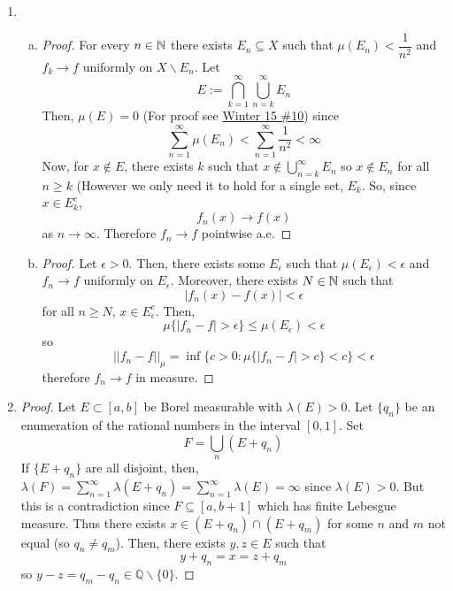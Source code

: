 \begin{enumerate}
\begin{enumerate}[(a)]
	\item \begin{proof}
		Let $f(t)=1$ for all $t \in [0,1]$. Then, $||f||_\infty=1$ and
			\[ ||Tf||_\infty = \sup_{t \in [0,1]} \left| \int_0^t s \, ds \right| = \sup_{t\in [0,1]} \dfrac{t^2}{2} = \dfrac 12 \]
		so $||T||=\dfrac 12$.
	\end{proof}
\end{enumerate}

\item \begin{enumerate}[(a)]
	\item \begin{proof}
		For every $n \in \mathbb{N}$ there exists $E_n \subseteq X$ such that $\mu(E_n) < \dfrac 1{n^2}$ and $f_k \to f$ uniformly on $X \backslash E_n$. Let 
			\[ E := \bigcap_{k=1}^\infty \bigcup_{n=k}^\infty E_n\]
		Then, $\mu(E) = 0$ (For proof see \hyperref[q:w15-10]{Winter 15 \#10}) since 
			\[ \sum_{n=1}^\infty \mu(E_n) < \sum_{n=1}^\infty \dfrac 1{n^2} < \infty \]
		Now, for $x \not\in E$, there exists $k$ such that $x \not\in \bigcup_{n=k}^\infty E_n$ so $x \not\in E_n$ for all $n \ge k$ (However we only need it to hold for a single set, $E_k$. So, since $x \in E_k^c$,
			\[ f_n(x) \to f(x) \]
		as $n \to \infty$. Therefore $f_n \to f$ pointwise a.e.
	\end{proof}
	
	\item \begin{proof}
		Let $\epsilon >0$. Then, there exists some $E_\epsilon$ such that $\mu(E_\epsilon) < \epsilon$ and $f_n \to f$ uniformly on $E_\epsilon$. Moreover, there exists $N \in \mathbb{N}$ such that
			\[ |f_n(x)-f(x)| < \epsilon \]
		for all $n \ge N$, $x \in E_\epsilon^c$. Then,
			\[ \mu\{|f_n-f| > \epsilon \} \le \mu(E_\epsilon) <\epsilon \]
		so
			\[ ||f_n-f||_\mu = \inf \{ c>0: \mu\{|f_n-f| > c \} <c \} < \epsilon \]
		therefore $f_n\to f$ in measure.
	\end{proof}
\end{enumerate}

\item
\begin{proof}
Let $E \subset [a,b]$ be Borel measurable with $\lambda(E)>0$. Let $\{q_n\}$ be an enumeration of the rational numbers in the interval $[0,1]$. Set
	\[ F = \bigcup_{n} (E + q_n) \]
If $\{E+q_n\}$ are all disjoint, then, $\lambda(F) = \sum_{n=1}^\infty \lambda(E+q_n) = \sum_{n=1}^\infty \lambda(E) = \infty$ since $\lambda(E) >0$. But this is a contradiction since $F \subseteq [a,b+1]$ which has finite Lebesgue measure. Thus there exists $x \in (E+q_n) \cap (E+q_m)$ for some $n$ and $m$ not equal (so $q_n \ne q_m$). Then, there exists $y,z \in E$ such that
	\[ y+q_n = x = z+q_m \]
so $y-z = q_m-q_n \in \mathbb{Q} \backslash \{0\}$.
\end{proof}


\end{enumerate}
